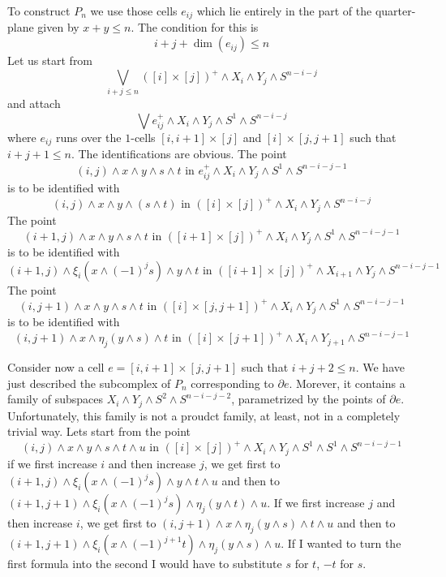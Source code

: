 \documentclass[../main]{subfiles}
\begin{document}
To construct $P_n$ we use those cells $e_{ij}$ which lie entirely in the part of the quarter-plane given by $x+y\leq n$. The condition for this is
$$i+j+\dim(e_{ij})\leq n$$
Let us start from
$$\bigvee_{i+j\leq n}([i]\times [j])^+ \wedge X_i \wedge Y_j \wedge S^{n-i-j}$$
and attach
$$\bigvee e_{ij}^+ \wedge X_i\wedge Y_j\wedge S^1 \wedge S^{n-i-j}$$
where $e_{ij}$ runs over the $1$-cells $[i,i+1]\times [j]$ and $[i]\times [j,j+1]$ such that $i+j+1\leq n$. The identifications are obvious. The point
$$(i,j)\wedge x\wedge y\wedge s\wedge t \text{  in  }e_{ij}^+\wedge X_i \wedge Y_j \wedge S^1 \wedge S^{n-i-j-1} $$
is to be identified with
$$(i,j)\wedge x\wedge y\wedge (s\wedge t) \text{  in  }([i]\times [j])^+\wedge X_i \wedge Y_j \wedge S^{n-i-j} $$
The point
$$(i+1,j)\wedge x\wedge y\wedge s\wedge t \text{  in  }([i+1]\times [j])^+\wedge X_{i} \wedge Y_j\wedge S^1 \wedge S^{n-i-j-1} $$
is to be identified with
$$(i+1,j)\wedge \xi_i( x\wedge (-1)^j s)\wedge y\wedge t \text{  in  }([i+1]\times [j])^+\wedge X_{i+1} \wedge Y_j \wedge S^{n-i-j-1} $$
The point
$$(i,j+1)\wedge x\wedge y\wedge s\wedge t \text{  in  }([i]\times [j,j+1])^+\wedge X_{i} \wedge Y_j\wedge S^1 \wedge S^{n-i-j-1} $$
is to be identified with
$$(i,j+1)\wedge x\wedge \eta_j(y\wedge s)\wedge t \text{  in  }([i]\times [j+1])^+\wedge X_{i} \wedge Y_{j+1} \wedge S^{n-i-j-1} $$

Consider now a cell $e=[i,i+1]\times [j,j+1]$ such that $i+j+2\leq n$. We have just described the subcomplex of $P_n$ corresponding to $\partial e$. Morever, it contains a family of subspaces $X_i\wedge Y_j \wedge S^2 \wedge S^{n-i-j-2}$, parametrized by the points of $\partial e$. Unfortunately, this family is not a proudct family, at least, not in a completely trivial way. Lets start from the point
$$(i,j)\wedge x\wedge y\wedge s\wedge t\wedge u \text{  in  }([i]\times[j])^+\wedge X_i \wedge Y_j \wedge S^1 \wedge S^1\wedge S^{n-i-j-1} $$
if we first increase $i$ and then increase $j$, we get first to $(i+1,j)\wedge \xi_i(x\wedge (-1)^j s) \wedge y\wedge t\wedge u $ and then to $(i+1,j+1)\wedge \xi_i(x\wedge (-1)^j s) \wedge \eta_j(y\wedge t)\wedge u $. If we first increase $j$ and then increase $i$, we get first to $(i,j+1)\wedge x\wedge   \eta_j(y\wedge s)\wedge t\wedge u $ and then to $(i+1,j+1)\wedge \xi_i(x\wedge (-1)^{j+1} t) \wedge \eta_j(y\wedge s)\wedge u $. If I wanted to turn the first formula into the second I would have to substitute $s$ for $t$, $-t$ for $s$.
\end{document}
